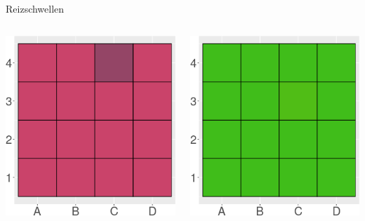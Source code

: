 \documentclass[aspectratio=169]{beamer}
\begin{document}
\begin{frame}{Reizschwellen}
\begin{itemize}
\begin{columns}[c]
    
    \begin{column}{3cm}
    \includegraphics[width=\textwidth]{color_test_screenshot.png}
    
    \end{column}
    
    
    \begin{column}{3cm}
    \includegraphics[width=\textwidth]{color_test_screenshot_2.png}
    

\end{column}
\end{columns}
\end{itemize}
\end{frame}
\end{document}
